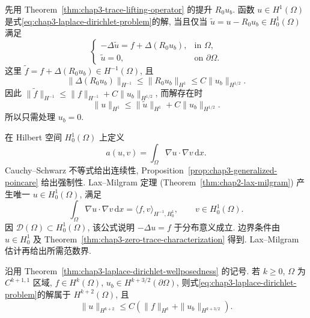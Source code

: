 \begin{Proof}
先用 Theorem~\ref{thm:chap3-trace-lifting-operator} 的提升 $R_0u_b$. 函数 $u\in H^1(\Omega)$ 是式\eqref{eq:chap3-laplace-dirichlet-problem}的解, 当且仅当 $\widetilde u=u-R_0u_b\in H_0^1(\Omega)$ 满足
\[
 \begin{cases}
 -\Delta\widetilde u=f+\Delta(R_0u_b),&\text{in }\Omega,\\
 \widetilde u=0,&\text{on }\partial\Omega.
 \end{cases}
\]
这里 $\widetilde f=f+\Delta(R_0u_b)\in H^{-1}(\Omega)$, 且
\[
 \|\Delta(R_0u_b)\|_{H^{-1}}
 \leq\|R_0u_b\|_{H^1}\leq C\|u_b\|_{H^{1/2}}.
\]
因此 $\|\widetilde f\|_{H^{-1}}\leq\|f\|_{H^{-1}}+C\|u_b\|_{H^{1/2}}$, 而解存在时
\[
 \|u\|_{H^1}\leq\|\widetilde u\|_{H^1}+C\|u_b\|_{H^{1/2}}.
\]
所以只需处理 $u_b=0$.

在 Hilbert 空间 $H_0^1(\Omega)$ 上定义
\[
 a(u,v)=\int_\Omega\nabla u\cdot\nabla v\,\mathrm dx.
\]
Cauchy--Schwarz 不等式给出连续性, Proposition~\ref{prop:chap3-generalized-poincare} 给出强制性. Lax--Milgram 定理 (Theorem~\ref{thm:chap2-lax-milgram}) 产生唯一 $u\in H_0^1(\Omega)$, 满足
\[
 \int_\Omega\nabla u\cdot\nabla v\,\mathrm dx
 =\langle f,v\rangle_{H^{-1},H_0^1},
 \qquad v\in H_0^1(\Omega).
\]
因 $\mathcal D(\Omega)\subset H_0^1(\Omega)$, 该公式说明 $-\Delta u=f$ 于分布意义成立. 边界条件由 $u\in H_0^1$ 及 Theorem~\ref{thm:chap3-zero-trace-characterization} 得到. Lax--Milgram 估计再给出所需范数界.
\end{Proof}

\begin{Theorem}
\label{thm:chap3-laplace-dirichlet-regularity}
沿用 Theorem~\ref{thm:chap3-laplace-dirichlet-wellposedness} 的记号. 若 $k\geq0$, $\Omega$ 为 $C^{k+1,1}$ 区域, $f\in H^k(\Omega)$, $u_b\in H^{k+3/2}(\partial\Omega)$, 则式\eqref{eq:chap3-laplace-dirichlet-problem}的解属于 $H^{k+2}(\Omega)$, 且
\[
 \|u\|_{H^{k+2}}\leq C(\|f\|_{H^k}+\|u_b\|_{H^{k+3/2}}).
\]
\end{Theorem}

